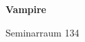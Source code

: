 \documentclass[a4paper]{article}
\begin{document}
\printGenericVSLHeader
\begin{center}
\begin{vsltext}{3cm}{4cm}

   \vspace{0.5cm} 

    \textbf{Vampire} 

    \vspace{1.5cm}

    Seminarraum 134

\end{vsltext}

\end{center}
\end{document}
